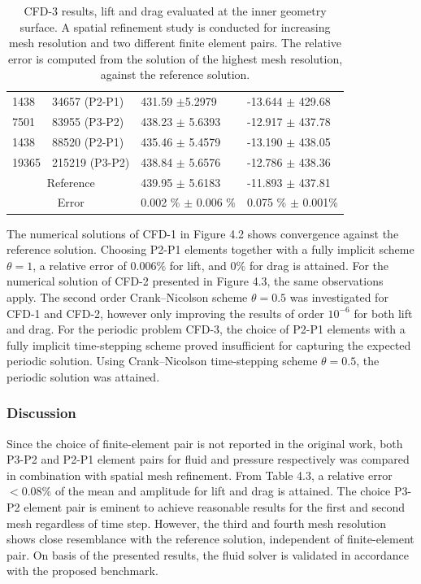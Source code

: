 \begin{table}[h!]
\begin{tabular}{ |p{1cm}||p{2.9cm}|p{3.3cm}|p{3.3cm}|}
 \hline
 1438    & 34657  (P2-P1)   & 431.59 $\pm$5.2979 & -13.644   $\pm$ 429.68 \\
 7501    & 83955 (P3-P2)  & 438.23      $\pm$  5.6393 & -12.917 $\pm$  437.78 \\
 \hline
 1438    & 88520  (P2-P1)   & 435.46  $\pm$ 5.4579 & -13.190   $\pm$ 438.05 \\
 19365   & 215219 (P3-P2)  & 438.84    $\pm$  5.6576 & -12.786      $\pm$  438.36 \\
\hline
 \multicolumn{2}{|c|}{Reference}  & 439.95 $\pm$ 5.6183 & -11.893 $\pm$ 437.81\\
 \hline
  \multicolumn{2}{|c|}{Error}  & 0.002 \% $\pm$ 0.006 \% & 0.075 \% $\pm$ 0.001\% \\
  \hline
\end{tabular}
\caption{CFD-3 results, lift and drag evaluated at the inner geometry surface. A spatial refinement study is conducted for increasing mesh resolution and two different finite element pairs. The relative error is computed from the solution of the highest mesh resolution, against the reference solution.}
\label{table:cfd3}
\end{table}
\newpage

The numerical solutions of CFD-1 in Figure 4.2 shows convergence against the reference solution. Choosing P2-P1 elements together with a fully implicit scheme $\theta = 1$, a relative error of $0.006 \%$ for lift, and $0\%$ for drag is attained. For the numerical solution of CFD-2 presented in Figure 4.3, the same observations apply. The second order Crank–Nicolson scheme  $\theta = 0.5$ was investigated for CFD-1 and CFD-2, however only improving the results of order $10^{-6}$ for both lift and drag. For the periodic problem CFD-3, the choice of  P2-P1 elements with a fully implicit time-stepping scheme proved insufficient for capturing the expected periodic solution. Using Crank–Nicolson time-stepping scheme $\theta = 0.5$, the periodic solution was attained. 

\subsubsection*{Discussion}
Since the choice of finite-element pair is not reported in the original work, both P3-P2 and P2-P1 element pairs for fluid and pressure respectively was compared in combination with spatial mesh refinement. From Table 4.3, a relative error $ < 0.08\%$ of the mean and amplitude for lift and drag is attained. The choice P3-P2 element pair is eminent to achieve reasonable results for the first and second mesh regardless of time step.  However, the third and fourth mesh resolution shows close resemblance with the reference solution, independent of finite-element pair. On basis of the presented results, the fluid solver is validated in accordance with the proposed benchmark. 

